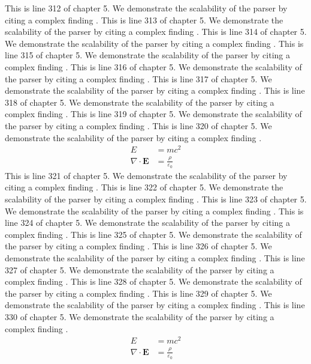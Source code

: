 This is line 312 of chapter 5. We demonstrate the scalability of the parser by citing a complex finding \cite{ref5_312}.
This is line 313 of chapter 5. We demonstrate the scalability of the parser by citing a complex finding \cite{ref5_313}.
This is line 314 of chapter 5. We demonstrate the scalability of the parser by citing a complex finding \cite{ref5_314}.
This is line 315 of chapter 5. We demonstrate the scalability of the parser by citing a complex finding \cite{ref5_315}.
This is line 316 of chapter 5. We demonstrate the scalability of the parser by citing a complex finding \cite{ref5_316}.
This is line 317 of chapter 5. We demonstrate the scalability of the parser by citing a complex finding \cite{ref5_317}.
This is line 318 of chapter 5. We demonstrate the scalability of the parser by citing a complex finding \cite{ref5_318}.
This is line 319 of chapter 5. We demonstrate the scalability of the parser by citing a complex finding \cite{ref5_319}.
This is line 320 of chapter 5. We demonstrate the scalability of the parser by citing a complex finding \cite{ref5_320}.
\begin{align*}
  E &= mc^2 \\
  \nabla \cdot \mathbf{E} &= \frac{\rho}{\varepsilon_0}
\end{align*}
This is line 321 of chapter 5. We demonstrate the scalability of the parser by citing a complex finding \cite{ref5_321}.
This is line 322 of chapter 5. We demonstrate the scalability of the parser by citing a complex finding \cite{ref5_322}.
This is line 323 of chapter 5. We demonstrate the scalability of the parser by citing a complex finding \cite{ref5_323}.
This is line 324 of chapter 5. We demonstrate the scalability of the parser by citing a complex finding \cite{ref5_324}.
This is line 325 of chapter 5. We demonstrate the scalability of the parser by citing a complex finding \cite{ref5_325}.
This is line 326 of chapter 5. We demonstrate the scalability of the parser by citing a complex finding \cite{ref5_326}.
This is line 327 of chapter 5. We demonstrate the scalability of the parser by citing a complex finding \cite{ref5_327}.
This is line 328 of chapter 5. We demonstrate the scalability of the parser by citing a complex finding \cite{ref5_328}.
This is line 329 of chapter 5. We demonstrate the scalability of the parser by citing a complex finding \cite{ref5_329}.
This is line 330 of chapter 5. We demonstrate the scalability of the parser by citing a complex finding \cite{ref5_330}.
\begin{align*}
  E &= mc^2 \\
  \nabla \cdot \mathbf{E} &= \frac{\rho}{\varepsilon_0}
\end{align*}
